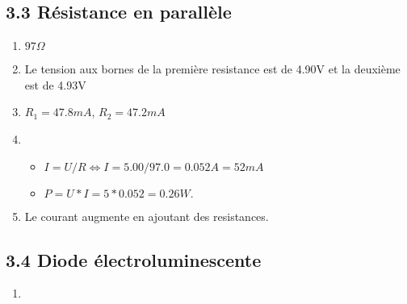 \documentclass[a4paper, 12pt]{article}
\begin{document}
\subsection*{3.3 Résistance en parallèle}
\begin{enumerate}
    \item $97 \Omega$
    \item Le tension aux bornes de la première resistance est de 4.90V et la deuxième est de 4.93V
    \item $R_1 = 47.8mA$, $R_2 = 47.2mA$
    \item 
        \begin{itemize}
            \item $I = U/R \Longleftrightarrow I = 5.00 / 97.0 = 0.052 A = 52 mA$
            \item $P = U * I = 5 * 0.052 = 0.26W.$
        \end{itemize}
    \item Le courant augmente en ajoutant des resistances.
\end{enumerate}

\subsection*{3.4 Diode électroluminescente}
\begin{enumerate}
    \item 
\end{enumerate}
\end{document}
